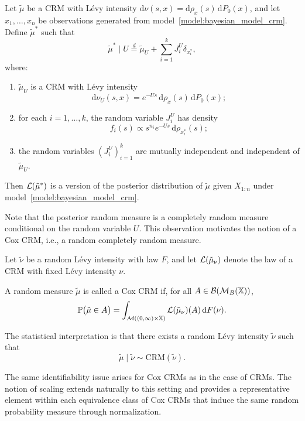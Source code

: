 \begin{theorem}\label{theorem:posterior_formula_crm}
Let $\tilde{\mu}$ be a CRM with L\'evy intensity $\mathrm{d}\nu(s,x) = \mathrm{d}\rho_x(s)\,\mathrm{d}P_0(x)$, and let $x_1,\dots,x_n$ be observations generated from model~\eqref{model:bayesian_model_crm}. Define $\tilde{\mu}^*$ such that
\[
\tilde{\mu}^* \mid U \overset{d}{=} \tilde{\mu}_U + \sum_{i=1}^k J_i^U \delta_{x_i^*},
\]
where:
\begin{enumerate}
    \item[(i)] $\tilde{\mu}_U$ is a CRM with L\'evy intensity
    \[
    \mathrm{d}\nu_U(s,x) = e^{-Us}\,\mathrm{d}\rho_x(s)\,\mathrm{d}P_0(x);
    \]
    \item[(ii)] for each $i=1,\dots,k$, the random variable $J_i^U$ has density
    \[
    f_i(s) \propto s^{n_i} e^{-Us}\,\mathrm{d}\rho_{x_i^*}(s);
    \]
    \item[(iii)] the random variables $(J_i^U)_{i=1}^k$ are mutually independent and independent of $\tilde{\mu}_U$.
\end{enumerate}
Then $\mathcal{L}(\tilde{\mu}^*)$ is a version of the posterior distribution of $\tilde{\mu}$ given $X_{1:n}$ under model~\eqref{model:bayesian_model_crm}.
\end{theorem}

Note that the posterior random measure is a completely random measure conditional on the random variable $U$. This observation motivates the notion of a Cox CRM, i.e., a random completely random measure.

\begin{definition}\label{definition:cox_crm}
Let $\tilde{\nu}$ be a random L\'evy intensity with law $F$, and let $\mathcal{L}(\tilde{\mu}_\nu)$ denote the law of a CRM with fixed L\'evy intensity $\nu$.

A random measure $\tilde{\mu}$ is called a Cox CRM if, for all $A \in \mathcal{B}(\mathcal{M}_B(\mathbb{X}))$,
\[
\mathbb{P}\bigl(\tilde{\mu} \in A\bigr)
    = \int_{\mathcal{M}((0,\infty)\times \mathbb{X})} \mathcal{L}(\tilde{\mu}_\nu)(A)\,\mathrm{d}F(\nu).
\]
\end{definition}

The statistical interpretation is that there exists a random L\'evy intensity $\tilde{\nu}$ such that
\[
\tilde{\mu} \mid \tilde{\nu} \sim \mathrm{CRM}(\tilde{\nu}).
\]

The same identifiability issue arises for Cox CRMs as in the case of CRMs. The notion of scaling extends naturally to this setting and provides a representative element within each equivalence class of Cox CRMs that induce the same random probability measure through normalization.

